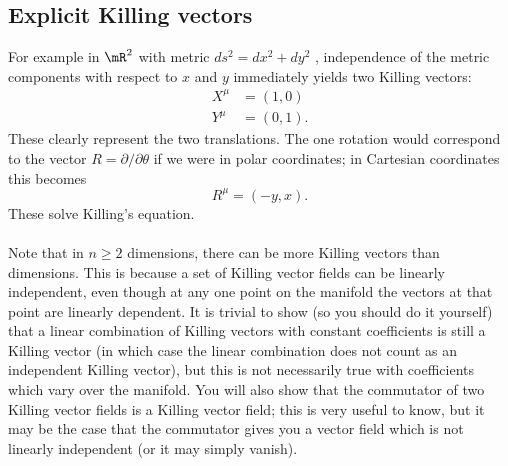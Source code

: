 \subsection{Explicit Killing vectors}
For example in $\mR^2$ with metric $ds^2 = dx^2 +dy^2$ ,
independence of the metric components with respect to $x$ and $y$ immediately yields two
Killing vectors:
\begin{align}
	X^\mu &= (1,0) \nonumber \\
	Y^\mu &= (0,1) .
\end{align}
These clearly represent the two translations. The one rotation would correspond to the
vector $R = ∂/∂θ$ if we were in polar coordinates; in Cartesian coordinates this becomes
\begin{equation}
	R^{\mu} =(-y,x).
\end{equation}
These solve Killing's equation.\\
\\
Note that in $n ≥ 2$ dimensions, there can be more Killing vectors than dimensions. This
is because a set of Killing vector fields can be linearly independent, even though at any one
point on the manifold the vectors at that point are linearly dependent. It is trivial to show
(so you should do it yourself) that a linear combination of Killing vectors with constant
coefficients is still a Killing vector (in which case the linear combination does not count as
an independent Killing vector), but this is not necessarily true with coefficients which vary
over the manifold. You will also show that the commutator of two Killing vector fields is a
Killing vector field; this is very useful to know, but it may be the case that the commutator
gives you a vector field which is not linearly independent (or it may simply vanish).


















